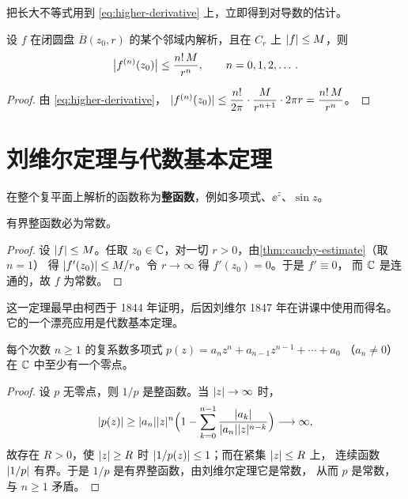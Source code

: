 \documentclass{mojing-notes}
\begin{document}
把长大不等式用到 \cref{eq:higher-derivative} 上，立即得到对导数的估计。

\begin{theorem}[柯西不等式]\label{thm:cauchy-estimate}
设 $f$ 在闭圆盘 $\overline{B}(z_0,r)$ 的某个邻域内解析，且在 $C_r$ 上 $\abs{f}\le M$，则
\[
  \abs[\big]{f^{(n)}(z_0)}\le\frac{n!\,M}{r^n},\qquad n=0,1,2,\dotsc .
\]
\end{theorem}

\begin{proof}
由 \cref{eq:higher-derivative}，
$\abs{f^{(n)}(z_0)}\le\dfrac{n!}{2\pi}\cdot\dfrac{M}{r^{n+1}}\cdot2\pi r=\dfrac{n!\,M}{r^n}$。
\end{proof}

\section{刘维尔定理与代数基本定理}

在整个复平面上解析的函数称为\textbf{整函数}，例如多项式、$\ee^z$、$\sin z$。

\begin{theorem}[刘维尔]\label{thm:liouville}
有界整函数必为常数。
\end{theorem}

\begin{proof}
设 $\abs{f}\le M$。任取 $z_0\in\C$，对一切 $r>0$，由\cref{thm:cauchy-estimate}（取 $n=1$）
得 $\abs{f'(z_0)}\le M/r$。令 $r\to\infty$ 得 $f'(z_0)=0$。于是 $f'\equiv0$，
而 $\C$ 是连通的，故 $f$ 为常数。
\end{proof}

这一定理最早由柯西于 1844 年证明，后因刘维尔 1847 年在讲课中使用而得名。%
它的一个漂亮应用是代数基本定理。

\begin{theorem}[代数基本定理]\label{thm:fta}
每个次数 $n\ge1$ 的复系数多项式 $p(z)=a_nz^n+a_{n-1}z^{n-1}+\dotsb+a_0$
（$a_n\ne0$）在 $\C$ 中至少有一个零点。
\end{theorem}

\begin{proof}
设 $p$ 无零点，则 $1/p$ 是整函数。当 $\abs{z}\to\infty$ 时，
\[
  \abs{p(z)}\ge\abs{a_n}\abs{z}^n
  \Bigl(1-\sum_{k=0}^{n-1}\frac{\abs{a_k}}{\abs{a_n}\abs{z}^{n-k}}\Bigr)\longrightarrow\infty,
\]
故存在 $R>0$，使 $\abs{z}\ge R$ 时 $\abs{1/p(z)}\le1$；而在紧集 $\abs{z}\le R$ 上，
连续函数 $\abs{1/p}$ 有界。于是 $1/p$ 是有界整函数，由刘维尔定理它是常数，
从而 $p$ 是常数，与 $n\ge1$ 矛盾。
\end{proof}
\end{document}
